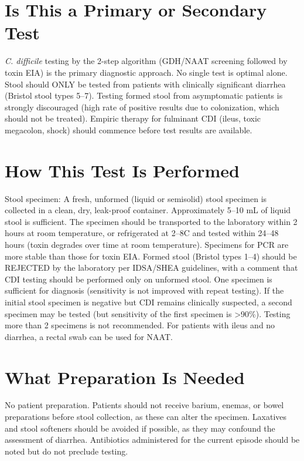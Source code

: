 \section*{Is This a Primary or Secondary Test}
\textit{C. difficile} testing by the 2-step algorithm (GDH/NAAT screening followed by toxin EIA) is the primary diagnostic approach. No single test is optimal alone. Stool should ONLY be tested from patients with clinically significant diarrhea (Bristol stool types 5--7). Testing formed stool from asymptomatic patients is strongly discouraged (high rate of positive results due to colonization, which should not be treated). Empiric therapy for fulminant CDI (ileus, toxic megacolon, shock) should commence before test results are available.

\section*{How This Test Is Performed}
Stool specimen: A fresh, unformed (liquid or semisolid) stool specimen is collected in a clean, dry, leak-proof container. Approximately 5--10 mL of liquid stool is sufficient. The specimen should be transported to the laboratory within 2 hours at room temperature, or refrigerated at 2--8\textdegree{}C and tested within 24--48 hours (toxin degrades over time at room temperature). Specimens for PCR are more stable than those for toxin EIA. Formed stool (Bristol types 1--4) should be REJECTED by the laboratory per IDSA/SHEA guidelines, with a comment that CDI testing should be performed only on unformed stool. One specimen is sufficient for diagnosis (sensitivity is not improved with repeat testing). If the initial stool specimen is negative but CDI remains clinically suspected, a second specimen may be tested (but sensitivity of the first specimen is >90\%). Testing more than 2 specimens is not recommended. For patients with ileus and no diarrhea, a rectal swab can be used for NAAT.

\section*{What Preparation Is Needed}
No patient preparation. Patients should not receive barium, enemas, or bowel preparations before stool collection, as these can alter the specimen. Laxatives and stool softeners should be avoided if possible, as they may confound the assessment of diarrhea. Antibiotics administered for the current episode should be noted but do not preclude testing.

